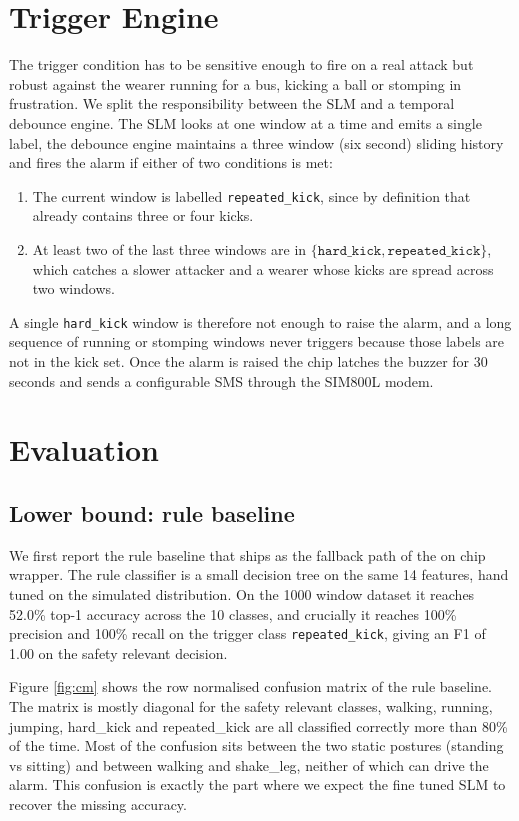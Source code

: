 \documentclass[conference]{IEEEtran}
\begin{document}
\section{Trigger Engine}

The trigger condition has to be sensitive enough to fire on a real attack but robust against the wearer running for a bus, kicking a ball or stomping in frustration. We split the responsibility between the SLM and a temporal debounce engine. The SLM looks at one window at a time and emits a single label, the debounce engine maintains a three window (six second) sliding history and fires the alarm if either of two conditions is met:
\begin{enumerate}
  \item The current window is labelled \texttt{repeated\_kick}, since by definition that already contains three or four kicks.
  \item At least two of the last three windows are in $\{\texttt{hard\_kick}, \texttt{repeated\_kick}\}$, which catches a slower attacker and a wearer whose kicks are spread across two windows.
\end{enumerate}
A single \texttt{hard\_kick} window is therefore not enough to raise the alarm, and a long sequence of running or stomping windows never triggers because those labels are not in the kick set. Once the alarm is raised the chip latches the buzzer for 30 seconds and sends a configurable SMS through the SIM800L modem.

\section{Evaluation}

\subsection{Lower bound: rule baseline}
We first report the rule baseline that ships as the fallback path of the on chip wrapper. The rule classifier is a small decision tree on the same 14 features, hand tuned on the simulated distribution. On the 1000 window dataset it reaches 52.0\% top-1 accuracy across the 10 classes, and crucially it reaches 100\% precision and 100\% recall on the trigger class \texttt{repeated\_kick}, giving an F1 of 1.00 on the safety relevant decision.

Figure \ref{fig:cm} shows the row normalised confusion matrix of the rule baseline. The matrix is mostly diagonal for the safety relevant classes, walking, running, jumping, hard\_kick and repeated\_kick are all classified correctly more than 80\% of the time. Most of the confusion sits between the two static postures (standing vs sitting) and between walking and shake\_leg, neither of which can drive the alarm. This confusion is exactly the part where we expect the fine tuned SLM to recover the missing accuracy.
\end{document}
